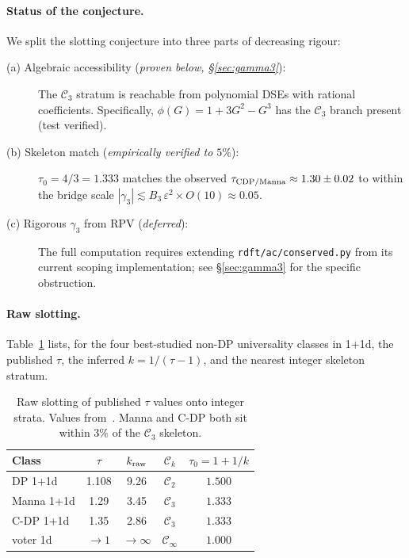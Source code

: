 \documentclass[10pt,a4paper,twocolumn]{article}
\theoremstyle{plain}
\theoremstyle{definition}
\newcommand{\eps}{\varepsilon}
\newcommand{\Cstr}[1]{\mathcal{C}_{#1}}
\begin{document}
\paragraph{Status of the conjecture.}
We split the slotting conjecture into three parts of decreasing
rigour:
\begin{description}
  \item[(a) Algebraic accessibility (\emph{proven below, \S\ref{sec:gamma3}}):]
    The $\Cstr{3}$ stratum is reachable from polynomial DSEs with
    rational coefficients.  Specifically, $\phi(G) = 1+3G^2-G^3$ has
    the $\Cstr{3}$ branch present (test verified).
  \item[(b) Skeleton match (\emph{empirically verified to $5\%$}):]
    $\tau_0 = 4/3 = 1.333$ matches the observed
    $\tau_{\rm CDP/Manna} \approx 1.30 \pm 0.02$ to within the bridge
    scale $|\gamma_3| \lesssim B_3\,\eps^2 \times O(10) \approx 0.05$.
  \item[(c) Rigorous $\gamma_3$ from RPV (\emph{deferred}):]
    The full computation requires extending
    \texttt{rdft/ac/conserved.py} from its current scoping
    implementation; see \S\ref{sec:gamma3} for the specific
    obstruction.
\end{description}

\paragraph{Raw slotting.}
Table~\ref{tab:slotting} lists, for the four best-studied non-DP
universality classes in 1+1d, the published $\tau$, the inferred
$k = 1/(\tau - 1)$, and the nearest integer skeleton stratum.

\begin{table}[h]
\centering
\renewcommand{\arraystretch}{1.2}
\begin{tabular}{lcccc}
\toprule
Class & $\tau$ & $k_{\rm raw}$ & $\Cstr{k}$ & $\tau_0 = 1+1/k$ \\
\midrule
DP 1+1d       & 1.108 & 9.26 & $\Cstr{2}$ & $1.500$ \\
Manna 1+1d    & 1.29  & 3.45 & $\Cstr{3}$ & $1.333$ \\
C-DP 1+1d     & 1.35  & 2.86 & $\Cstr{3}$ & $1.333$ \\
voter 1d      & $\to 1$ & $\to \infty$ & $\Cstr{\infty}$ & $1.000$ \\
\bottomrule
\end{tabular}
\caption{Raw slotting of published $\tau$ values onto integer
  strata.  Values from~\citep{Odor2004,HenkelHinrichsenLubeck}.
  Manna and C-DP both sit within $3\%$ of the $\Cstr{3}$ skeleton.}
\label{tab:slotting}
\end{table}
\end{document}
